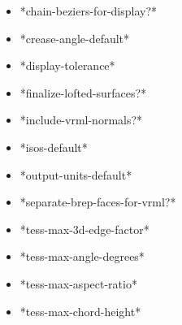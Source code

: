 \documentclass [11pt]{book}
\begin{document}
\begin{itemize}
\item {}*chain-beziers-for-display?*





\item {}*crease-angle-default*





\item {}*display-tolerance*





\item {}*finalize-lofted-surfaces?*





\item {}*include-vrml-normals?*





\item {}*isos-default*





\item {}*output-units-default*





\item {}*separate-brep-faces-for-vrml?*





\item {}*tess-max-3d-edge-factor*





\item {}*tess-max-angle-degrees*





\item {}*tess-max-aspect-ratio*





\item {}*tess-max-chord-height*






\end{itemize}
\end{document}
